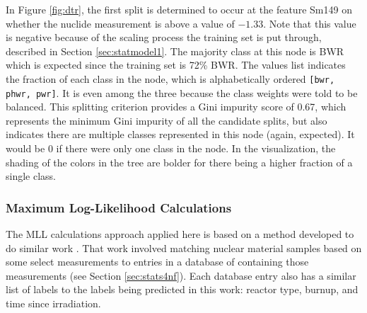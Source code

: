 In Figure \ref{fig:dtr}, the first split is determined to occur at the feature
Sm149 on whether the nuclide measurement is above a value of $-1.33$. Note that
this value is negative because of the scaling process the training set is put
through, described in Section \ref{sec:statmodel1}. The majority class at this
node is \gls{BWR} which is expected since the training set is 72\% \gls{BWR}.
The values list indicates the fraction of each class in the node, which is
alphabetically ordered \texttt{[bwr, phwr, pwr]}. It is even among the three
because the class weights were told to be balanced.  This splitting criterion
provides a Gini impurity score of 0.67, which represents the minimum Gini
impurity of all the candidate splits, but also indicates there are multiple
classes represented in this node (again, expected).  It would be 0 if there
were only one class in the node.  In the visualization, the shading of the
colors in the tree are bolder for there being a higher fraction of a single
class.

\subsubsection{Maximum Log-Likelihood Calculations}

The \gls{MLL} calculations approach applied here is based on a method developed
to do similar work \cite{mll_method, mll_validate, mll_sensitivity}.  That work
involved matching nuclear material samples based on some select measurements to
entries in a database of containing those measurements (see Section
\ref{sec:stats4nf}).  Each database entry also has a similar list of labels to
the labels being predicted in this work: reactor type, burnup, and time since
irradiation.

